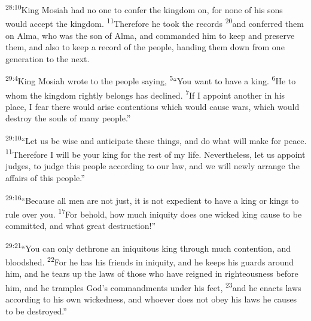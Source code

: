 \documentclass[openany,12pt,english]{book}
\newenvironment{para}{\par\pretolerance=100\tolerance=200\setlength{\emergencystretch}{0.6em}\relax}{\par}
\begin{document}
\bigskip{}

\begin{para}
    \textsuperscript{28:10}\thinspace{}King Mo\-si\-ah had no one to con\-fer the king\-dom on, for none of his sons would ac\-cept the king\-dom.
    \textsuperscript{11}\thinspace{}There\-fore he took the records
    \textsuperscript{20}\thinspace{}and con\-ferred them on Al\-ma, who was the son of Al\-ma, and commanded him to keep and pre\-serve them, and al\-so to keep a rec\-ord of the peo\-ple, handing them down from one gen\-er\-a\-tion to the next.
\end{para}

\begin{para}
    \textsuperscript{29:4}\thinspace{}King Mo\-si\-ah wrote to the peo\-ple say\-ing,
    \textsuperscript{5}\thinspace{}“You want to have a king.
    \textsuperscript{6}\thinspace{}He to whom the king\-dom right\-ly belongs has de\-clined.
    \textsuperscript{7}\thinspace{}If I ap\-point an\-oth\-er in his place, I fear there would a\-rise contentions which would cause wars, which would de\-stroy the souls of man\-y peo\-ple.”
\end{para}

\begin{para}
    \textsuperscript{29:10}\thinspace{}“Let us be wise and an\-tic\-i\-pate these things, and do what will make for peace.
    \textsuperscript{11}\thinspace{}There\-fore I will be your king for the rest of my life. Nev\-er\-the\-less, let us ap\-point judges, to judge this peo\-ple ac\-cord\-ing to our law, and we will new\-ly ar\-range the af\-fairs of this peo\-ple.”
\end{para}

\begin{para}
    \textsuperscript{29:16}\thinspace{}“Be\-cause all men are not just, it is not ex\-pe\-di\-ent to have a king or kings to rule o\-ver you.
    \textsuperscript{17}\thinspace{}For be\-hold, how much in\-iq\-ui\-ty does one wick\-ed king cause to be com\-mit\-ted, and what great de\-struc\-tion!”
\end{para}

\begin{para}
    \textsuperscript{29:21}\thinspace{}“You can on\-ly de\-throne an in\-iq\-ui\-tous king through much con\-ten\-tion, and blood\-shed.
    \textsuperscript{22}\thinspace{}For he has his friends in in\-iq\-ui\-ty, and he keeps his guards a\-round him, and he tears up the laws of those who have reigned in right\-eous\-ness be\-fore him, and he tramples God's commandments un\-der his feet,
    \textsuperscript{23}\thinspace{}and he enacts laws ac\-cord\-ing to his own wick\-ed\-ness, and who\-ev\-er does not o\-bey his laws he causes to be destroyed.”
\end{para}
\end{document}
